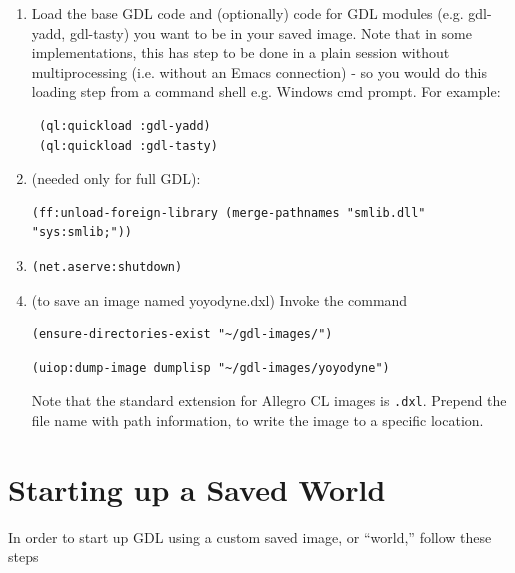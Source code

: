\documentclass [11pt]{book}
\begin{document}
\begin{enumerate}

\item Load the base GDL code and (optionally) code for GDL
modules (e.g. gdl-yadd, gdl-tasty) you want to be in your saved
image. Note that in some implementations, this has step to be done in
a plain session without multiprocessing (i.e. without an Emacs
connection) - so you would do this loading step from a command shell
e.g. Windows cmd prompt. For example:

\begin{verbatim}
 (ql:quickload :gdl-yadd) 
 (ql:quickload :gdl-tasty)
\end{verbatim}

\item (needed only for full GDL):

\begin{verbatim}(ff:unload-foreign-library (merge-pathnames "smlib.dll" "sys:smlib;"))
\end{verbatim}

\item 

\begin{verbatim}(net.aserve:shutdown)
\end{verbatim}

\item  (to save an image named yoyodyne.dxl) Invoke the command 

\begin{verbatim}(ensure-directories-exist "~/gdl-images/")
\end{verbatim}

\begin{verbatim}(uiop:dump-image dumplisp "~/gdl-images/yoyodyne")
\end{verbatim}Note that the standard extension for Allegro CL images is \texttt{.dxl}. Prepend the file name with path information, to write the image to a specific location.

\end{enumerate}



\section{Starting up a Saved World}

\label{sec:startingupasavedworld}

In order to start up GDL using a custom saved image, or ``world,'' follow these steps
\end{document}
